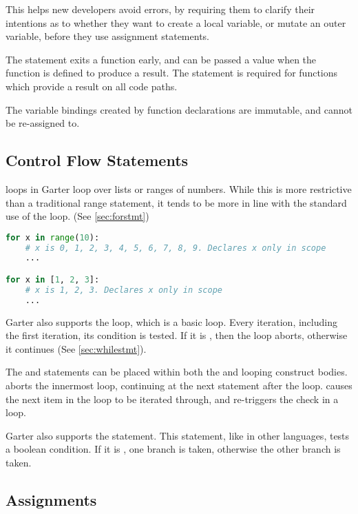 This helps new developers avoid errors, by requiring them to clarify their
intentions as to whether they want to create a local variable, or mutate an
outer variable, before they use assignment statements.

The  statement exits a function early, and can be passed a value
when the function is defined to produce a result. The  statement is
required for functions which provide a result on all code paths.

The variable bindings created by function declarations are immutable, and cannot
be re-assigned to.

\subsection{Control Flow Statements}

 loops in Garter loop over lists or ranges of numbers. While this is more
restrictive than a traditional range statement, it tends to be more in line with
the standard use of the  loop. (See \ref{sec:forstmt})

\begin{lstlisting}[language=Python]
for x in range(10):
    # x is 0, 1, 2, 3, 4, 5, 6, 7, 8, 9. Declares x only in scope
    ...

for x in [1, 2, 3]:
    # x is 1, 2, 3. Declares x only in scope
    ...
\end{lstlisting}

Garter also supports the  loop, which is a basic loop. Every
iteration, including the first iteration, its condition is tested. If it
is , then the loop aborts, otherwise it continues
(See \ref{sec:whilestmt}).


The  and  statements can be placed within both
the  and  looping construct bodies.  aborts
the innermost loop, continuing at the next statement after the
loop.  causes the next item in the  loop to be iterated
through, and re-triggers the check in a  loop.

Garter also supports the  statement. This statement, like in other
languages, tests a boolean condition. If it is , one branch is taken,
otherwise the other branch is taken.

\subsection{Assignments}

